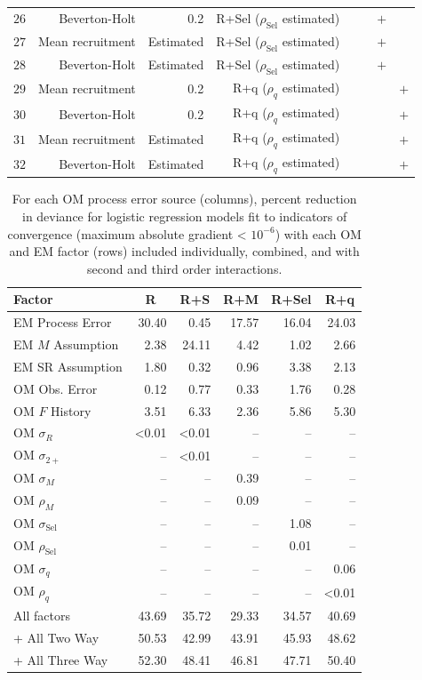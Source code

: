 \documentclass[
  12pt,
]{article}
\begin{document}
\begin{table}
{\begin{center}
\begin{tabular}{rrrrrrrr}
$26$&Beverton-Holt&0.2&R+Sel ($\rho_{\text{Sel}}$ estimated)&&&$+$&\tabularnewline
$27$&Mean recruitment&Estimated&R+Sel ($\rho_{\text{Sel}}$ estimated)&&&$+$&\tabularnewline
$28$&Beverton-Holt&Estimated&R+Sel ($\rho_{\text{Sel}}$ estimated)&&&$+$&\tabularnewline
$29$&Mean recruitment&0.2&R+q ($\rho_{q}$ estimated)&&&&$+$\tabularnewline
$30$&Beverton-Holt&0.2&R+q ($\rho_{q}$ estimated)&&&&$+$\tabularnewline
$31$&Mean recruitment&Estimated&R+q ($\rho_{q}$ estimated)&&&&$+$\tabularnewline
$32$&Beverton-Holt&Estimated&R+q ($\rho_{q}$ estimated)&&&&$+$\tabularnewline
\hline
\end{tabular}\end{center}
}
\end{table}

\begin{table}
\caption{For each OM process error source (columns), percent reduction in deviance for logistic regression models fit to indicators of convergence (maximum absolute gradient < $10^{-6}$) with each OM and EM factor (rows) included individually, combined, and with second and third order interactions.}\label{convergence_gradient_PRD_table}
{\begin{center}
\begin{tabular}{lrrrrr}
\hline\hline
\multicolumn{1}{l}{Factor}&\multicolumn{1}{c}{R}&\multicolumn{1}{c}{R+S}&\multicolumn{1}{c}{R+M}&\multicolumn{1}{c}{R+Sel}&\multicolumn{1}{c}{R+q}\tabularnewline
\hline
EM Process Error&30.40& 0.45&17.57&16.04&24.03\tabularnewline
EM $M$ Assumption& 2.38&24.11& 4.42& 1.02& 2.66\tabularnewline
EM SR Assumption& 1.80& 0.32& 0.96& 3.38& 2.13\tabularnewline
OM Obs. Error& 0.12& 0.77& 0.33& 1.76& 0.28\tabularnewline
OM $F$ History& 3.51& 6.33& 2.36& 5.86& 5.30\tabularnewline
OM $\sigma_R$&\textless  0.01&\textless  0.01&--&--&--\tabularnewline
OM $\sigma_{2+}$ &--&\textless  0.01&--&--&--\tabularnewline
OM $\sigma_M$&--&--& 0.39&--&--\tabularnewline
OM $\rho_M$&--&--& 0.09&--&--\tabularnewline
OM $\sigma_{\text{Sel}}$&--&--&--& 1.08&--\tabularnewline
OM $\rho_{\text{Sel}}$&--&--&--& 0.01&--\tabularnewline
OM $\sigma_q$&--&--&--&--& 0.06\tabularnewline
OM $\rho_q$&--&--&--&--&\textless  0.01\tabularnewline
All factors&43.69&35.72&29.33&34.57&40.69\tabularnewline
+ All Two Way&50.53&42.99&43.91&45.93&48.62\tabularnewline
+ All Three Way&52.30&48.41&46.81&47.71&50.40\tabularnewline
\hline
\end{tabular}\end{center}
}
\end{table}
\end{document}
